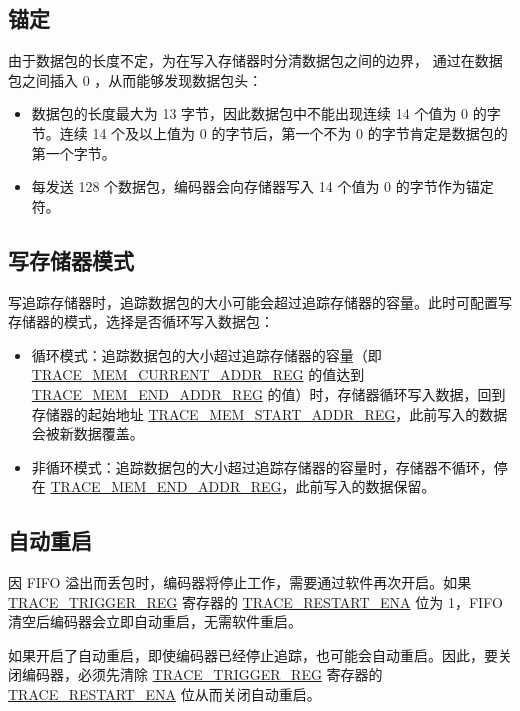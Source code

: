 \documentclass[main\_\_CN.tex]{subfiles}
\begin{document}
\subsection{锚定}

由于数据包的长度不定，为在写入存储器时分清数据包之间的边界，\chipname{} 通过在数据包之间插入 0 ，从而能够发现数据包头：
\begin{itemize}
    \item 数据包的长度最大为 13 字节，因此数据包中不能出现连续 14 个值为 0 的字节。连续 14 个及以上值为 0 的字节后，第一个不为 0 的字节肯定是数据包的第一个字节。
    \item 每发送 128 个数据包，编码器会向存储器写入 14 个值为 0 的字节作为锚定符。
\end{itemize}


\subsection{写存储器模式}

写追踪存储器时，追踪数据包的大小可能会超过追踪存储器的容量。此时可配置写存储器的模式，选择是否循环写入数据包：

\begin{itemize}
    \item 循环模式：追踪数据包的大小超过追踪存储器的容量（即\hyperref[regdesc:TRACEMEMCURRENTADDRREG]{TRACE\_MEM\_CURRENT\_ADDR\_REG} 的值达到 \hyperref[regdesc:TRACEMEMENDADDRREG]{TRACE\_MEM\_END\_ADDR\_REG} 的值）时，存储器循环写入数据，回到存储器的起始地址 \hyperref[regdesc:TRACEMEMSTARTADDRREG]{TRACE\_MEM\_START\_ADDR\_REG}，此前写入的数据会被新数据覆盖。
    \item 非循环模式：追踪数据包的大小超过追踪存储器的容量时，存储器不循环，停在 \hyperref[regdesc:TRACEMEMENDADDRREG]{TRACE\_MEM\_END\_ADDR\_REG}，此前写入的数据保留。
\end{itemize}

\subsection{自动重启}

因 FIFO 溢出而丢包时，编码器将停止工作，需要通过软件再次开启。如果 \hyperref[regdesc:TRACETRIGGERREG]{TRACE\_TRIGGER\_REG} 寄存器的 \hyperref[fielddesc:TRACERESTARTENA]{TRACE\_RESTART\_ENA} 位为 1，FIFO 清空后编码器会立即自动重启，无需软件重启。

如果开启了自动重启，即使编码器已经停止追踪，也可能会自动重启。因此，要关闭编码器，必须先清除 \hyperref[regdesc:TRACETRIGGERREG]{TRACE\_TRIGGER\_REG} 寄存器的 \hyperref[fielddesc:TRACERESTARTENA]{TRACE\_RESTART\_ENA} 位从而关闭自动重启。
\end{document}
